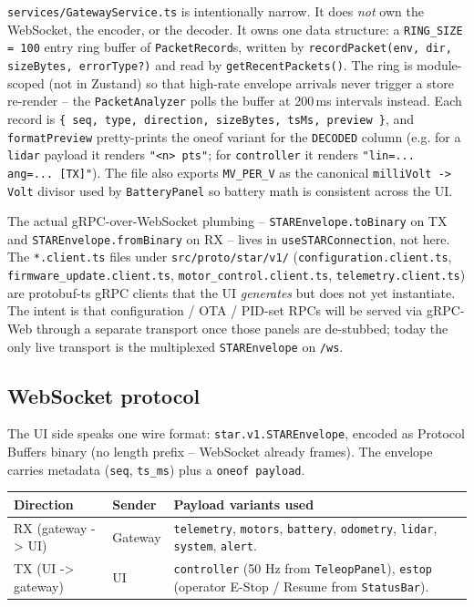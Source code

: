 \texttt{services/GatewayService.ts} is intentionally narrow. It does
\emph{not} own the WebSocket, the encoder, or the decoder. It owns one
data structure: a \texttt{RING\_SIZE = 100} entry ring buffer of
\texttt{PacketRecord}s, written by \texttt{recordPacket(env, dir,
sizeBytes, errorType?)} and read by \texttt{getRecentPackets()}. The
ring is module-scoped (not in Zustand) so that high-rate envelope
arrivals never trigger a store re-render -- the
\texttt{PacketAnalyzer} polls the buffer at 200\,ms intervals instead.
Each record is \texttt{\{ seq, type, direction, sizeBytes, tsMs,
preview \}}, and \texttt{formatPreview} pretty-prints the oneof
variant for the \texttt{DECODED} column (e.g. for a \texttt{lidar}
payload it renders \texttt{"<n> pts"}; for \texttt{controller} it
renders \texttt{"lin=...\,ang=...\,[TX]"}). The file also exports
\texttt{MV\_PER\_V} as the canonical \texttt{milliVolt -> Volt}
divisor used by \texttt{BatteryPanel} so battery math is consistent
across the UI.

The actual gRPC-over-WebSocket plumbing -- \texttt{STAREnvelope.toBinary}
on TX and \texttt{STAREnvelope.fromBinary} on RX -- lives in
\texttt{useSTARConnection}, not here. The \texttt{*.client.ts} files
under \texttt{src/proto/star/v1/} (\texttt{configuration.client.ts},
\texttt{firmware\_update.client.ts}, \texttt{motor\_control.client.ts},
\texttt{telemetry.client.ts}) are protobuf-ts gRPC clients that the UI
\emph{generates} but does not yet instantiate. The intent is that
configuration / OTA / PID-set RPCs will be served via gRPC-Web through
a separate transport once those panels are de-stubbed; today the only
live transport is the multiplexed \texttt{STAREnvelope} on
\texttt{/ws}.

\subsection{WebSocket protocol}

The UI side speaks one wire format: \texttt{star.v1.STAREnvelope},
encoded as Protocol Buffers binary (no length prefix -- WebSocket
already frames). The envelope carries metadata
(\texttt{seq}, \texttt{ts\_ms}) plus a \texttt{oneof payload}.

\begin{center}
\begin{tabular}{|p{2.6cm}|p{3.4cm}|p{8.6cm}|}
\hline
\textbf{Direction} & \textbf{Sender}    & \textbf{Payload variants used}                                                                                                  \\
\hline
RX (gateway -> UI) & Gateway            & \texttt{telemetry}, \texttt{motors}, \texttt{battery}, \texttt{odometry}, \texttt{lidar}, \texttt{system}, \texttt{alert}.       \\
TX (UI -> gateway) & UI                 & \texttt{controller} (50 Hz from \texttt{TeleopPanel}), \texttt{estop} (operator E-Stop / Resume from \texttt{StatusBar}).        \\
\hline
\end{tabular}
\end{center}

